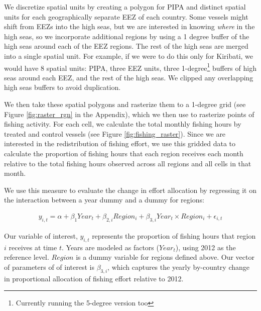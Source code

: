 \documentclass[9pttwoside,lineno]{pnas-new}
\begin{document}
We discretize spatial units by creating a polygon for
PIPA and distinct
spatial units for each geographically separate EEZ of each country. Some vessels might shift
from EEZs into the high seas, but we are interested in knowing
\emph{where} in the high seas, so we incorporate additional regions by
using a 1 degree buffer of the high seas around each of the EEZ regions.
The rest of the high seas are merged into a single spatial unit. For
example, if we were to do this only for Kiribati, we would have 8
spatial units: PIPA, three EEZ units, three 1-degree\footnote{Currently running the 5-degree version too} buffers of high seas
around each EEZ, and the rest of the high seas. We clipped any overlapping
high seas buffers to avoid duplication.

We then take these spatial polygons and rasterize them to a 1-degree grid
(see Figure \ref{fig:raster_rgn} in the Appendix), which we then use to rasterize points
of fishing activity. For each cell, we calculate the total monthly
fishing hours by treated and control vessels (see Figure
\ref{fig:fishing_raster}). Since we are interested in the redistribution
of fishing effort, we use this gridded data to calculate the proportion
of fishing hours that each region receives each month relative to the
total fishing hours observed across all regions and all cells in that
month.

We use this measure to evaluate the change in effort allocation by
regressing it on the interaction between a year dummy and a dummy for
regions:

\begin{figure}[h]
\begin{align*}
y_{i,t} = \alpha + \beta_1Year_t + \beta_{2,i}Region_i + \beta_{3,i}Year_t \times Region_i+ \epsilon_{i,t}
\end{align*}
\end{figure}


Our variable of interest, $y_{i,t}$ represents the proportion of
fishing hours that region $i$ receives at time $t$. Years are
modeled as factors ($Year_t$), using 2012 as the reference level.
\(Region\) is a dummy variable for regions defined above. Our vector of parameters of
of interest is $\beta_{3,i}$, which captures the yearly by-country
change in proportional allocation of fishing effort relative to 2012.
\end{document}
